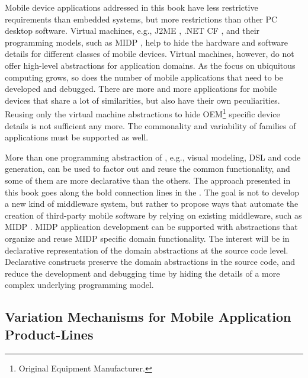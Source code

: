 Mobile device applications addressed in this book have less restrictive requirements than embedded systems, but more restrictions than other PC desktop software. Virtual machines, e.g., J2ME \cite{www.j2me}, .NET CF \cite{dnetcf}, and their programming models, such as MIDP \cite{www.midp-ota}, help to hide the hardware and software details for different classes of mobile devices. Virtual machines, however, do not offer high-level abstractions for application domains. As the focus on ubiquitous computing grows, so does the number of mobile applications that need to be developed and debugged. There are more and more applications for mobile devices that share a lot of similarities, but also have their own peculiarities. Reusing only the virtual machine abstractions to hide OEM\footnote{Original Equipment Manufacturer.} specific device details is not sufficient any more. The commonality and variability of families of applications must be supported as well.

More than one programming abstraction of , e.g., visual modeling, DSL and code generation, can be used to factor out and reuse the common functionality, and some of them are more declarative than the others. The approach presented in this book goes along the bold connection lines in the . The goal is not to develop a new kind of middleware system, but rather to propose ways that automate the creation of third-party mobile software by relying on existing middleware, such as MIDP \cite{www.midp-ota}. MIDP application development can be supported with abstractions that organize and reuse MIDP specific domain functionality. The interest will be in declarative representation of the domain abstractions at the source code level. Declarative constructs preserve the domain abstractions in the source code, and reduce the development and debugging time by hiding the details of a more complex underlying programming model.

\subsection{Variation Mechanisms for Mobile Application Product-Lines}

